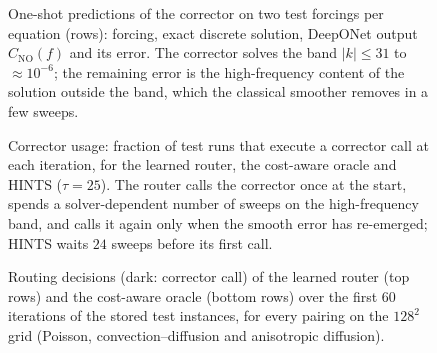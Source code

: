 \begin{table}[H]
\color{red}
\centering
\caption{Convection--diffusion on the $\caN\times\caN$ grid: median wall-clock time to relative error $\varepsilon$ for every policy and pairing ($64$ instances).}
\resizebox{\textwidth}{!}{\cawctolconv}
\label{tab:ca_tol_convdiff}
\end{table}

\begin{table}[H]
\color{red}
\centering
\caption{Anisotropic diffusion on the $\caN\times\caN$ grid: median wall-clock time to relative error $\varepsilon$ for every policy and pairing ($64$ instances). The point smoothers alone do not reach $h^2$ within $60{,}000$ iterations (their times are lower bounds).}
\resizebox{\textwidth}{!}{\cawctolaniso}
\label{tab:ca_tol_aniso}
\end{table}

\begin{figure}[H]
\color{red}
    \centering
    \caption{One-shot predictions of the corrector on two test forcings per equation (rows): forcing, exact discrete solution, DeepONet output $C_{\mathrm{NO}}(f)$ and its error. The corrector solves the band $|k|\le 31$ to $\approx 10^{-6}$; the remaining error is the high-frequency content of the solution outside the band, which the classical smoother removes in a few sweeps.}
    \label{fig:ca_predictions}
\end{figure}

\begin{figure}[H]
\color{red}
    \centering
    \caption{Corrector usage: fraction of test runs that execute a corrector call at each iteration, for the learned router, the cost-aware oracle and HINTS ($\tau = 25$). The router calls the corrector once at the start, spends a solver-dependent number of sweeps on the high-frequency band, and calls it again only when the smooth error has re-emerged; HINTS waits $24$ sweeps before its first call.}
    \label{fig:ca_usage}
\end{figure}

\begin{figure}[H]
\color{red}
    \centering
    \caption{Routing decisions (dark: corrector call) of the learned router (top rows) and the cost-aware oracle (bottom rows) over the first $60$ iterations of the stored test instances, for every pairing on the $128^2$ grid (Poisson, convection--diffusion and anisotropic diffusion).}
    \label{fig:ca_decisions}
\end{figure}

